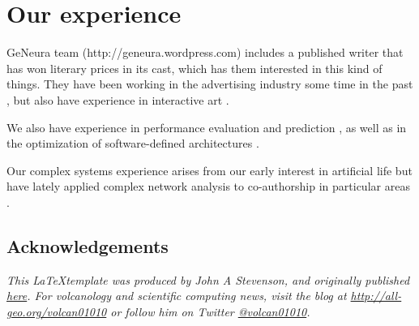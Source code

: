 \documentclass[a4paper]{article}
\begin{document}
\section{Our experience}

GeNeura team (http://geneura.wordpress.com) includes a published
writer that has won literary prices in its cast, which has them
interested in this kind of things. They have been working in the
advertising industry some time in the past
\cite{merelo:ecal97,AISB97}, but also have experience in interactive
art \cite{DBLP:conf/cec/TrujilloVVG13,DBLP:conf/cec/FernandesIBRG11}.


We also have experience in performance evaluation and prediction
\cite{castillo:evostar08,hardwareevo}, as well as in the optimization of
software-defined architectures \cite{gecco08:castillo}.

Our complex systems experience arises from our early interest in
artificial life \cite{ecal93} but have lately applied complex network
analysis to co-authorship in particular areas
\cite{ec-network-2007,merelo2013complex,DBLP:journals/corr/abs-1108-0261}. 

\subsection*{Acknowledgements}
\textit{This \LaTeX template was produced by John A Stevenson, and originally published \href{http://all-geo.org/volcan01010/2013/07/grant-applications-are-hard-work-includes-latex-template}{here}.  For volcanology and scientific computing news, visit the blog at \href{http://all-geo.org/volcan01010}{http://all-geo.org/volcan01010} or follow him on Twitter \href{https://twitter.com/volcan01010}{@volcan01010}.}



\end{document}
